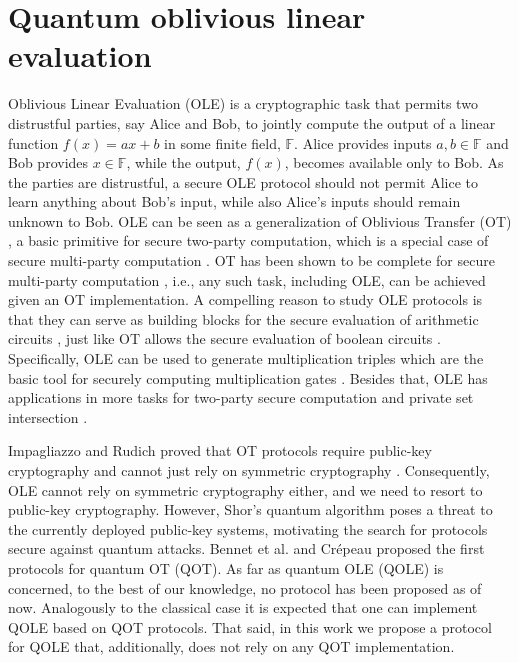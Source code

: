 


%

\chapter{Quantum oblivious linear evaluation}

Oblivious Linear Evaluation (OLE) is a cryptographic task that permits two distrustful parties, say Alice and Bob, to jointly compute the output of a linear function $f(x)=ax+b$ in some finite field, $\mathbb{F}$. Alice provides inputs $a, b\in\mathbb{F}$ and Bob provides $x\in\mathbb{F}$, while the output, $f(x)$, becomes available only to Bob. As the parties are distrustful, a secure OLE protocol should not permit Alice to learn anything about Bob's input, while also Alice's inputs should remain unknown to Bob.  OLE can be seen as a generalization of Oblivious Transfer (OT) \cite{Rabin81}, a basic primitive for secure two-party computation, which is a special case of secure multi-party computation \cite{Goldreichbook04,CCD88,Canetti00MPC}. OT has been shown to be complete  for secure multi-party computation \cite{Kilian}, i.e., any such task, including OLE, can be achieved given an OT implementation. 
A compelling reason to study OLE protocols is that they can serve as building blocks for the secure evaluation of arithmetic circuits \cite{AIK11,DKMQ12,GNN17,DGNBNT17}, just like OT allows the secure evaluation of boolean circuits \cite{GMW87}. Specifically, OLE can be used to generate multiplication triples which are the basic tool for securely computing multiplication gates \cite{DGNBNT17}. Besides that, OLE has applications in more tasks for two-party secure computation  \cite{IPS09,ADINZ17,BCGI18,HIMV19,CDIKLOV19} and private set intersection \cite{GN19}.
 
Impagliazzo and Rudich proved that OT protocols require public-key cryptography and cannot just rely on symmetric cryptography \cite{IR89}. Consequently, OLE cannot rely on symmetric cryptography either, and we need to resort to public-key cryptography.  However, Shor's  quantum algorithm \cite{Shor94}  poses a threat to the currently deployed public-key systems, motivating the search for protocols secure against quantum attacks. Bennet et al. \cite{BBCS92} and Cr{\'e}peau \cite{C94} proposed the first protocols for quantum OT (QOT). As far as quantum OLE (QOLE) is concerned, to the best of our knowledge, no protocol has been proposed as of now.
Analogously to the classical case it is expected that one can implement QOLE based on QOT protocols. That said, in this work we propose a protocol for QOLE that, additionally, does not rely on any QOT implementation.

